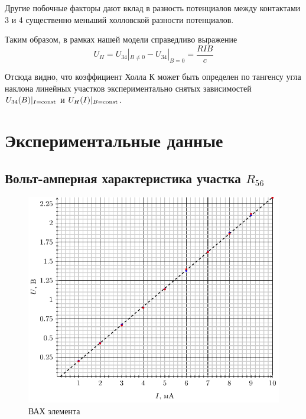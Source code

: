 Другие побочные факторы дают вклад в разность потенциалов между контактами 3 и 4 существенно меньший холловской разности потенциалов. 

Таким образом, в рамках нашей модели справедливо выражение
\begin{equation}
	U_H=U_{34}|_{B\ne 0}-U_{34}|_{B= 0}=\frac{RIB}{c}
\end{equation}

Отсюда видно, что коэффициент Холла $К$ может быть определен по тангенсу угла наклона линейных участков экспериментально снятых зависимостей $U_{34}(B)|_{I=\text{\rmfamily\upshape const}}$ и $U_H(I)|_{B=\text{\rmfamily\upshape const}}$.

\section{Экспериментальные данные}
\subsection{Вольт-амперная характеристика участка $R_{56}$}
\begin{figure}[H]
	\centering
	\includegraphics[width=\textwidth]{img/vax}
	\caption{ВАХ элемента}
	\label{fig:vax}
\end{figure}
